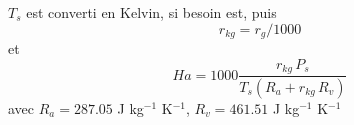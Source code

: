 $T_s$ est converti en Kelvin, si besoin est, puis \newline
\[
r_{kg} = r_g/1000
\]
et
\[
Ha = 1000 \frac{r_{kg} \, P_{s}}{ T_{s}  (R_a + r_{kg} \, R_v) }
\]
avec $R_a = 287.05 $ J kg$^{-1}$ K$^{-1} $,
$R_v = 461.51$ J kg$^{-1}$ K$^{-1}$ 
